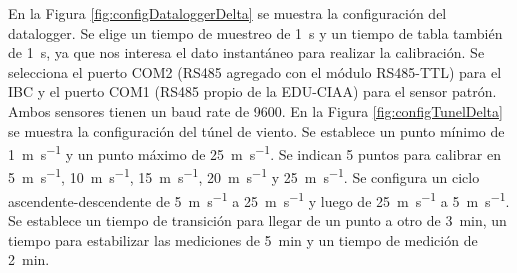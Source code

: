 En la Figura \ref{fig:configDataloggerDelta} se muestra la configuración del datalogger. Se elige un tiempo de muestreo de \SI{1}{\second} y un tiempo de tabla también de \SI{1}{\second}, ya que nos interesa el dato instantáneo para realizar la calibración. Se selecciona el puerto COM2 (RS485 agregado con el módulo RS485-TTL) para el IBC y el puerto COM1 (RS485 propio de la EDU-CIAA) para el sensor patrón. Ambos sensores tienen un baud rate de \SI{9600}{}. En la Figura \ref{fig:configTunelDelta} se muestra la configuración del túnel de viento. Se establece un punto mínimo de \SI{1}{\meter\per\second} y un punto máximo de \SI{25}{\meter\per\second}. Se indican 5 puntos para calibrar en \SI{5}{\meter\per\second}, \SI{10}{\meter\per\second}, \SI{15}{\meter\per\second}, \SI{20}{\meter\per\second} y \SI{25}{\meter\per\second}. Se configura un ciclo ascendente-descendente de \SI{5}{\meter\per\second} a \SI{25}{\meter\per\second} y luego de \SI{25}{\meter\per\second} a \SI{5}{\meter\per\second}. Se establece un tiempo de transición para llegar de un punto a otro de \SI{3}{\minute}, un tiempo para estabilizar las mediciones de \SI{5}{\minute} y un tiempo de medición de \SI{2}{\minute}.

